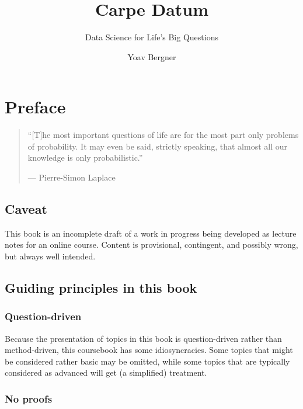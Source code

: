 \documentclass[
  openany]{book}
\title{Carpe Datum}
\subtitle{Data Science for Life's Big Questions}
\author{Yoav Bergner}
\date{}
\begin{document}
\maketitle

\hypertarget{preface}{%
\chapter*{Preface}\label{preface}}

\begin{quote}
``{[}T{]}he most important questions of life are for the most part only problems of probability. It may even be said, strictly speaking, that almost all our knowledge is only probabilistic.''

--- Pierre-Simon Laplace
\end{quote}

\hypertarget{caveat}{%
\section*{Caveat}\label{caveat}}

This book is an incomplete draft of a work in progress being developed as lecture notes for an online course. Content is provisional, contingent, and possibly wrong, but always well intended.

\hypertarget{guiding-principles-in-this-book}{%
\section*{Guiding principles in this book}\label{guiding-principles-in-this-book}}

\hypertarget{question-driven}{%
\subsection*{Question-driven}\label{question-driven}}

Because the presentation of topics in this book is question-driven rather than method-driven, this coursebook has some idiosyncracies. Some topics that might be considered rather basic may be omitted, while some topics that are typically considered as advanced will get (a simplified) treatment.

\hypertarget{no-proofs}{%
\subsection*{No proofs}\label{no-proofs}}
\end{document}
